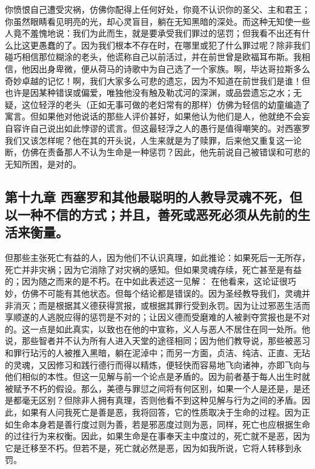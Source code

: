 \par

你愤恨自己遭受灾祸，仿佛你配得上任何好处，你竟不认识你的圣父、主和君王；你虽然眼睛看见明亮的光，却心灵盲目，躺在无知黑暗的深处。而这种无知使一些人竟不羞愧地说：我们为此而生，就是要承受我们罪过的惩罚；但我看不出还有什么比这更愚蠢的了。因为我们根本不存在时，在哪里或犯了什么罪过呢？除非我们碰巧相信那位糊涂的老头，他谎称自己以前活过，并在前世曾是欧福耳布斯。我相信，他因出身卑微，便从荷马的诗歌中为自己选了一个家族。啊，毕达哥拉斯多么奇妙卓越的记忆！啊，我们大家多么可悲的遗忘，因为不知道在前世我们是谁！但也许是因某种错误或偏爱，唯独他没有触及勒忒河的深渊，或品尝遗忘之水；无疑，这位轻浮的老头（正如无事可做的老妇常有的那样）仿佛为轻信的幼童编造了寓言。但如果他对他说话的那些人评价甚好，如果他认为他们是人，他就绝不会妄自容许自己说出如此悖谬的谎言。但这最轻浮之人的愚行是值得嘲笑的。对西塞罗我们又该怎样呢？他在其的开头说，人生来就是为了赎罪，后来他又重复这一论断，仿佛在责备那人不认为生命是一种惩罚？因此，他先前说自己被错误和可悲的无知所困，是对的。\par


\subsection{第十九章 西塞罗和其他最聪明的人教导灵魂不死，但以一种不信的方式；并且，善死或恶死必须从先前的生活来衡量。}

但那些主张死亡有益的人，因为他们不认识真理，如此推论：如果死后一无所存，死亡并非灾祸；因为它消除了对灾祸的感知。但如果灵魂存续，死亡甚至是有益的；因为随之而来的是不朽。在中如此表述这一见解： 在他看来，这论证很巧妙，仿佛不可能有其他状态。但每个结论都是错误的。因为圣经教导我们，灵魂并非消灭；而是根据其义德获得赏报，或根据其罪行受到永罚。因为让过邪恶生活而享顺遂的人逃脱应得的惩罚是不对的；让因义德而受磨难的人被剥夺赏报也是不对的。这一点是如此真实，以致也在他的中宣称，义人与恶人不居住在同一处所。他说，那些智者并不认为所有人进入天堂的途径相同；因为他们教导说，那些被恶习和罪行玷污的人被推入黑暗，躺在泥淖中；而另一方面，贞洁、纯洁、正直、无玷的灵魂，又因修习和践行德行而得以精炼，便轻快而容易地飞向诸神，亦即飞向与他们相似的本性。但这一见解与前一个论点是矛盾的。因为前者基于每人出生时就被赋予不朽的假设。那么，美德与罪愆之间将有何区别，如果一个人是还是，是还是都毫无区别？但除非人拥有真理，否则他看不到这种见解与行为之间的矛盾。因此，如果有人问我死亡是善是恶，我将回答，它的性质取决于生命的过程。因为正如生命本身若是善行度过则为善，若是邪恶度过则为恶，同样，死亡也应根据生命的过往行为来权衡。因此，如果生命是在事奉天主中度过的，死亡就不是恶，因为它是迁移至不朽。但若不是，死亡就必然是恶，因为如我所说，它将人转移到永罚。\par

